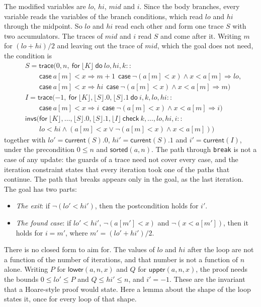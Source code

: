 \documentclass[11pt,a4paper]{article}
\newcommand{\bl}[1]{\lfloor #1\rfloor}                       %
\newcommand{\tr}[3]{\mathsf{trace}(#1,\ \mathsf{for}\ #2\ \mathsf{do}\ #3)}
\newcommand{\al}[2]{\mathsf{invs}(\mathsf{for}\ #1\ \mathsf{check}\ #2)}
\newcommand{\cur}{\mathsf{current}}
\begin{document}
The modified variables are $lo$, $hi$, $mid$ and $i$. Since the body branches, every variable reads the variables
of the branch conditions, which read $lo$ and $hi$ through the midpoint. So $lo$ and $hi$ read each other and form
one trace $S$ with two accumulators. The traces of $mid$ and $i$ read $S$ and come after it. Writing $m$ for
$(lo + hi)/2$ and leaving out the trace of $mid$, which the goal does not need, the condition is
\begin{align*}
&S = \mathsf{trace}(0, n,\ \mathsf{for}\ \bl{K}\ \mathsf{do}\ lo, hi, k ::\\
&\qquad \mathsf{case}\ a[m] < x \Rightarrow m + 1\ \ \mathsf{case}\ \neg(a[m] < x) \wedge x < a[m] \Rightarrow lo,\\
&\qquad \mathsf{case}\ a[m] < x \Rightarrow hi\ \ \mathsf{case}\ \neg(a[m] < x) \wedge x < a[m] \Rightarrow m)\\
&I = \tr{-1}{\bl{K}, \bl{S}.0, \bl{S}.1}{i, k, lo, hi ::\\
&\qquad \mathsf{case}\ a[m] < x \Rightarrow i\ \ \mathsf{case}\ \neg(a[m] < x) \wedge x < a[m] \Rightarrow i}\\
&\al{\bl{K}, \ldots, \bl{S}.0, \bl{S}.1, \bl{I}}{k, \ldots, lo, hi, i ::\\
&\qquad lo < hi \wedge (a[m] < x \vee \neg(a[m] < x) \wedge x < a[m])}
\end{align*}
together with $lo' = \cur(S).0$, $hi' = \cur(S).1$ and $i' = \cur(I)$, under the precondition $0 \le n$ and
$\mathsf{sorted}(a, n)$. The path through \lstinline|break| is not a case of any update: the guards of a trace need
not cover every case, and the iteration constraint states that every iteration took one of the paths that
continue. The path that breaks appears only in the goal, as the last iteration. The goal has two parts:
\begin{itemize}
\item \emph{The exit}: if $\neg(lo' < hi')$, then the postcondition holds for $i'$.
\item \emph{The found case}: if $lo' < hi'$, $\neg(a[m'] < x)$ and $\neg(x < a[m'])$, then it holds for
  $i = m'$, where $m' = (lo' + hi')/2$.
\end{itemize}

There is no closed form to aim for. The values of $lo$ and $hi$ after the loop are not a function of the number
of iterations, and that number is not a function of $n$ alone. Writing $P$ for $\mathsf{lower}(a, n, x)$ and $Q$
for $\mathsf{upper}(a, n, x)$, the proof needs the bounds $0 \le lo' \le P$ and $Q \le hi' \le n$, and $i' = -1$.
These are the invariant that a Hoare-style proof would state. Here a lemma about the shape of the loop states it,
once for every loop of that shape.
\end{document}
